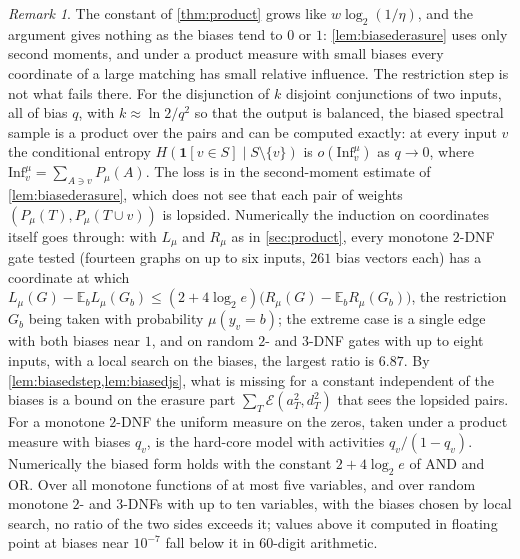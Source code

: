 \documentclass[11pt]{amsart}
\theoremstyle{remark}
\newtheorem{remark}[theorem]{Remark}
\newcommand{\E}{\mathbb{E}}
\newcommand{\Inf}{\mathrm{Inf}}
\begin{document}
\begin{remark}
The constant of \cref{thm:product} grows like $w\log_2(1/\eta)$, and the argument gives nothing as the biases tend to
$0$ or $1$: \cref{lem:biasederasure} uses only second moments, and under a product measure with small biases every
coordinate of a large matching has small relative influence. The restriction step is not what fails there. For the disjunction of $k$
disjoint conjunctions of two inputs, all of bias $q$, with $k\approx\ln2/q^2$ so that the output is balanced, the
biased spectral sample is a product over the pairs and can be computed exactly: at every input $v$ the conditional
entropy $H(\mathbf 1[v\in S]\mid S\setminus\{v\})$ is $o(\Inf^\mu_v)$ as $q\to0$, where
$\Inf^\mu_v=\sum_{A\ni v}P_\mu(A)$. The loss is in the second-moment estimate of \cref{lem:biasederasure}, which does not
see that each pair of weights $(P_\mu(T),P_\mu(T\cup v))$ is lopsided. Numerically the induction on coordinates itself
goes through: with $L_\mu$ and $R_\mu$ as in \cref{sec:product}, every
monotone $2$-DNF gate tested (fourteen graphs on up to six inputs, $261$ bias vectors each) has a coordinate at which
$L_\mu(G)-\E_bL_\mu(G_b)\le(2+4\log_2e)\bigl(R_\mu(G)-\E_bR_\mu(G_b)\bigr)$, the restriction $G_b$ being taken with probability $\mu(y_v=b)$;
the extreme case is a single edge with both biases near $1$, and on random $2$- and $3$-DNF gates with up to eight inputs,
with a local search on the biases, the largest ratio is $6.87$. By \cref{lem:biasedstep,lem:biasedjs}, what is missing
for a constant independent of the biases is a bound on the erasure part $\sum_T\mathcal E(a_T^2,d_T^2)$ that sees the
lopsided pairs. For a monotone $2$-DNF the uniform measure on the zeros, taken under a product
measure with biases $q_v$, is the hard-core model with activities $q_v/(1-q_v)$. Numerically the biased form holds
with the constant $2+4\log_2e$ of AND and OR. Over all monotone functions of at most five variables, and over random
monotone $2$- and $3$-DNFs with up to ten variables, with the biases chosen by local search, no ratio of the two sides
exceeds it; values above it computed in floating point at biases near $10^{-7}$ fall below it in $60$-digit
arithmetic.
\end{remark}
\end{document}
